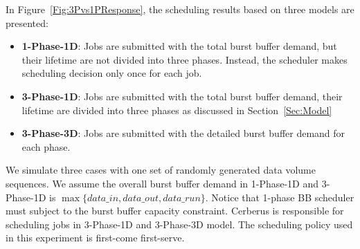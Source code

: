 In Figure~\ref{Fig:3Pvs1PResponse}, the scheduling results based on three models
are presented:
\begin{itemize}
        \item \textbf{1-Phase-1D}: Jobs are submitted with the total burst buffer demand,
        but their lifetime are not divided into three phases. 
	Instead, the scheduler makes scheduling decision only once for each job.

        \item \textbf{3-Phase-1D}: Jobs are submitted with the total burst buffer demand,
        their lifetime are divided into three phases as discussed in Section~\ref{Sec:Model}
        
        \item \textbf{3-Phase-3D}: Jobs are submitted with the detailed burst buffer demand for each phase.
\end{itemize}
We simulate three cases with one set of randomly generated data volume sequences.
We assume the overall burst buffer demand in 1-Phase-1D and 3-Phase-1D is
$\max \{data\_in, data\_out, data\_run\}$.
Notice that 1-phase BB scheduler must subject to the burst buffer capacity constraint.
Cerberus is responsible for scheduling jobs in 3-Phase-1D and 3-Phase-3D model.
The scheduling policy used in this experiment is first-come first-serve.

% 


